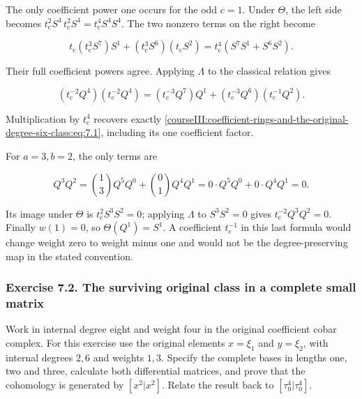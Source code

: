 The only coefficient power one occurs for the odd \(c=1\). Under \(\Theta\), the left side becomes
\(t_{\mathrm c}^2S^4\,t_{\mathrm c}^2S^4=t_{\mathrm c}^4S^4S^4\). The two nonzero terms on the right become

\begin{equation}
t_{\mathrm c}(t_{\mathrm c}^3S^7)S^1
          +(t_{\mathrm c}^3S^6)(t_{\mathrm c}S^2)
     =t_{\mathrm c}^4(S^7S^1+S^6S^2).
 \label{courseIII:coefficient-rings-and-the-original-degree-six-class:eq:7.2}
\end{equation}

Their full coefficient powers agree. Applying \(\Lambda\) to the classical relation gives

\begin{equation}
(t_{\mathrm c}^{-2}Q^4)(t_{\mathrm c}^{-2}Q^4)
   =(t_{\mathrm c}^{-3}Q^7)Q^1
           +(t_{\mathrm c}^{-3}Q^6)(t_{\mathrm c}^{-1}Q^2).
 \label{courseIII:coefficient-rings-and-the-original-degree-six-class:eq:7.3}
\end{equation}

Multiplication by \(t_{\mathrm c}^4\) recovers exactly \eqref{courseIII:coefficient-rings-and-the-original-degree-six-class:eq:7.1}, including its one coefficient factor.

For \(a=3,b=2\), the only terms are

\begin{equation}
Q^3Q^2=\binom13 Q^5Q^0+\binom01 Q^4Q^1
                    =0\cdot Q^5Q^0+0\cdot Q^4Q^1=0.
 \label{courseIII:coefficient-rings-and-the-original-degree-six-class:eq:7.4}
\end{equation}

Its image under \(\Theta\) is \(t_{\mathrm c}^2S^3S^2=0\); applying \(\Lambda\) to \(S^3S^2=0\) gives \(t_{\mathrm c}^{-2}Q^3Q^2=0\). Finally \(w(1)=0\), so \(\Theta(Q^1)=S^1\). A coefficient \(t_{\mathrm c}^{-1}\) in this last formula would change weight zero to weight minus one and would not be the degree-preserving map in the stated convention.

\subsubsection{Exercise 7.2. The surviving original class in a complete small matrix}
\label{courseIII:coefficient-rings-and-the-original-degree-six-class:exercise-7.2}

\label{courseIII:coefficient-rings:7.2}

Work in internal degree eight and weight four in the original coefficient cobar complex. For this exercise use the original elements \(x=\xi_1\) and \(y=\xi_2\), with internal degrees \(2,6\) and weights \(1,3\). Specify the complete bases in lengths one, two and three, calculate both differential matrices, and prove that the cohomology is generated by \([x^2|x^2]\). Relate the result back to \([\tau_0^4|\tau_0^4]\).

